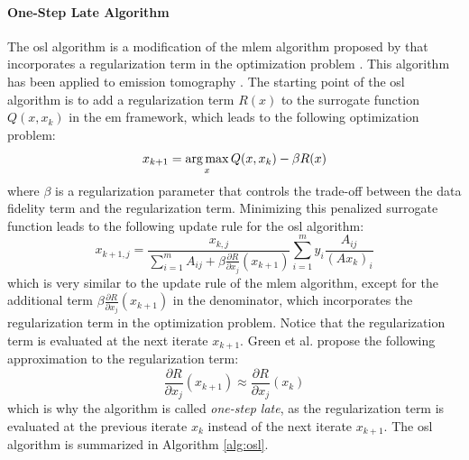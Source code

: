 
\paragraph{One-Step Late Algorithm}

The \acrfull{osl} algorithm is a modification of the \acrshort{mlem} algorithm proposed by \cite{green_use_1990} that incorporates a regularization term in the optimization problem \cite{green_use_1990}.
This algorithm has been applied to emission tomography \cite{green_bayesian_1990}.
The starting point of the \acrshort{osl} algorithm is to add a regularization term $R(x)$ to the surrogate function $Q(x, x_k)$ in the \acrshort{em} framework, which leads to the following optimization problem:
\begin{equation}
    x_{k+1} = \mathop{\mathrm{arg\,max}}_x Q(x, x_k) - \beta R(x)
\end{equation}
where $\beta$ is a regularization parameter that controls the trade-off between the data fidelity term and the regularization term.
Minimizing this penalized surrogate function leads to the following update rule for the \acrshort{osl} algorithm:
\begin{equation}
    x_{k+1,j} = \frac{x_{k,j}}{\sum_{i=1}^{m} A_{ij} + \beta \frac{\partial R}{\partial x_j}(x_{k+1})} \sum_{i=1}^{m} y_i \frac{A_{ij}}{(Ax_k)_i}
\end{equation}
which is very similar to the update rule of the \acrshort{mlem} algorithm, except for the additional term $\beta \frac{\partial R}{\partial x_j}(x_{k+1})$ in the denominator, which incorporates the regularization term in the optimization problem.
Notice that the regularization term is evaluated at the next iterate $x_{k+1}$.
Green et al. propose the following approximation to the regularization term:
\begin{equation}
    \frac{\partial R}{\partial x_j}(x_{k+1}) \approx \frac{\partial R}{\partial x_j}(x_{k})
\end{equation}
which is why the algorithm is called \textit{one-step late}, as the regularization term is evaluated at the previous iterate $x_k$ instead of the next iterate $x_{k+1}$.
The \acrshort{osl} algorithm is summarized in Algorithm \ref{alg:osl}.
